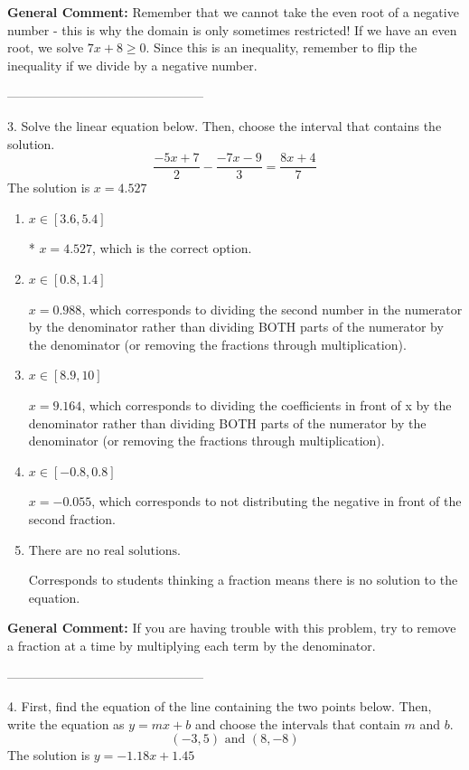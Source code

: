 \documentclass{extbook}[14pt]
\begin{document}
\textbf{General Comment:} Remember that we cannot take the even root of a negative number - this is why the domain is only sometimes restricted! If we have an even root, we solve $7 x + 8 \geq 0$. Since this is an inequality, remember to flip the inequality if we divide by a negative number. 

-----------------------------------------------

3. Solve the linear equation below. Then, choose the interval that contains the solution.
\[ \frac{-5x + 7}{2} - \frac{-7x -9}{3} = \frac{8x + 4}{7} \] 
The solution is $ x = 4.527 $ 

\begin{enumerate}[label=\Alph*.] 
\item $ x \in [3.6, 5.4] $ 

 * $x = 4.527$, which is the correct option. 
\item $ x \in [0.8, 1.4] $ 

  $x = 0.988$, which corresponds to dividing the second number in the numerator by the denominator rather than dividing BOTH parts of the numerator by the denominator (or removing the fractions through multiplication). 
\item $ x \in [8.9, 10] $ 

  $x = 9.164$, which corresponds to dividing the coefficients in front of x by the denominator rather than dividing BOTH parts of the numerator by the denominator (or removing the fractions through multiplication). 
\item $ x \in [-0.8, 0.8] $ 

  $x = -0.055$, which corresponds to not distributing the negative in front of the second fraction. 
\item $ \text{There are no real solutions.} $ 

 Corresponds to students thinking a fraction means there is no solution to the equation. 
\end{enumerate} 
 
\textbf{General Comment:} If you are having trouble with this problem, try to remove a fraction at a time by multiplying each term by the denominator. 

-----------------------------------------------

4. First, find the equation of the line containing the two points below. Then, write the equation as $ y=mx+b $ and choose the intervals that contain $m$ and $b$.
\[ (-3, 5) \text{ and } (8, -8) \] 
The solution is $ y = -1.18x + 1.45 $ 
\end{document}
